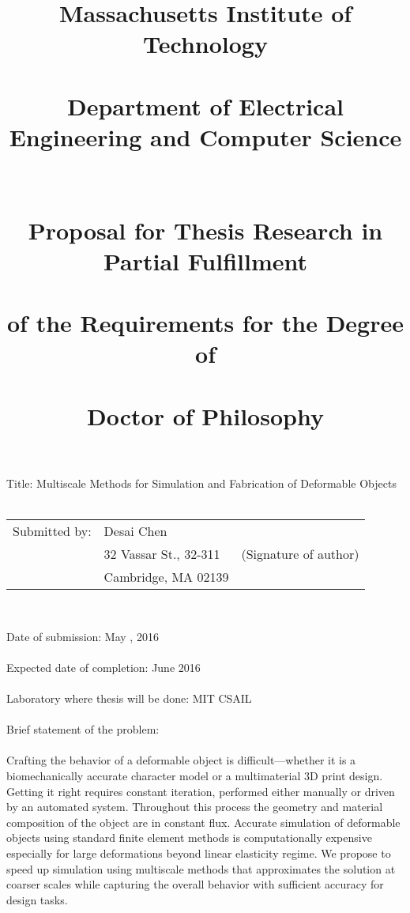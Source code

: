 \documentclass[11pt]{article}
\title{ \large{Massachusetts Institute of Technology\\~\\
	Department of Electrical Engineering and Computer Science\\~\\~\\
	Proposal for Thesis Research in Partial Fulfillment\\~\\
	of the Requirements for the Degree of\\~\\
	Doctor of Philosophy }}
\date{}
\begin{document}
	\maketitle
\begin{flushleft}
 Title: Multiscale Methods for Simulation and Fabrication of Deformable Objects\\~\\
\end{flushleft} 
\hskip-0.2cm\begin{tabular}{p{4cm} p{6cm} p{8cm}}
 	 Submitted by: & Desai Chen & \underline{\hspace{6cm}}\\
                   &32 Vassar St., 32-311 & (Signature of author) 	  \\
                   &Cambridge, MA 02139&
\end{tabular}\\
\begin{flushleft}
Date of submission: May , 2016\\~\\
Expected date of completion: June 2016\\~\\
Laboratory where thesis will be done: MIT CSAIL\\~\\
Brief statement of the problem:\\~\\
Crafting the behavior of a deformable object is difficult---whether it is a biomechanically accurate character model or a multimaterial 3D print design.
Getting it right requires constant iteration, performed either manually or driven by an automated system.
Throughout this process the geometry and material composition of the object are in constant flux.
Accurate simulation of deformable objects using standard finite element methods is computationally expensive especially for large deformations beyond linear elasticity regime.
We propose to speed up simulation using multiscale methods that approximates the solution at coarser scales while capturing the overall behavior with sufficient accuracy for design tasks.
\end{flushleft}
\end{document}
